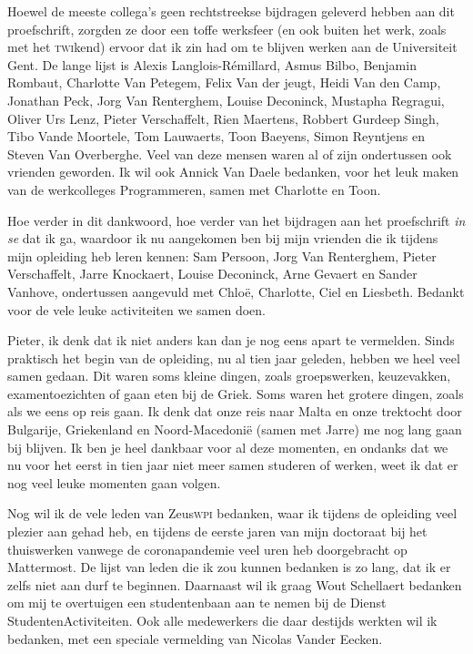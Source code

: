 \documentclass[main]{subfiles}
\begin{document}
Hoewel de meeste collega's geen rechtstreekse bijdragen geleverd hebben aan dit proefschrift, zorgden ze door een toffe werksfeer (en ook buiten het werk, zoals met het \textsc{twi}kend) ervoor dat ik zin had om te blijven werken aan de Universiteit Gent.
De lange lijst is Alexis Langlois-Rémillard, Asmus Bilbo, Benjamin Rombaut, Charlotte Van Petegem, Felix Van der jeugt, Heidi Van den Camp, Jonathan Peck, Jorg Van Renterghem, Louise Deconinck, Mustapha Regragui, Oliver Urs Lenz, Pieter Verschaffelt, Rien Maertens, Robbert Gurdeep Singh, Tibo Vande Moortele, Tom Lauwaerts, Toon Baeyens, Simon Reyntjens en Steven Van Overberghe.
Veel van deze mensen waren al of zijn ondertussen ook vrienden geworden.
Ik wil ook Annick Van Daele bedanken, voor het leuk maken van de werkcolleges Programmeren, samen met Charlotte en Toon.

Hoe verder in dit dankwoord, hoe verder van het bijdragen aan het proefschrift \textit{in se} dat ik ga, waardoor ik nu aangekomen ben bij mijn vrienden die ik tijdens mijn opleiding heb leren kennen: Sam Persoon, Jorg Van Renterghem, Pieter Verschaffelt, Jarre Knockaert, Louise Deconinck, Arne Gevaert en Sander Vanhove, ondertussen aangevuld met Chloë, Charlotte, Ciel en Liesbeth.
Bedankt voor de vele leuke activiteiten we samen doen.

Pieter, ik denk dat ik niet anders kan dan je nog eens apart te vermelden.
Sinds praktisch het begin van de opleiding, nu al tien jaar geleden, hebben we heel veel samen gedaan.
Dit waren soms kleine dingen, zoals groepswerken, keuzevakken, examentoezichten of gaan eten bij de Griek.
Soms waren het grotere dingen, zoals als we eens op reis gaan.
Ik denk dat onze reis naar Malta en onze trektocht door Bulgarije, Griekenland en Noord-Macedonië (samen met Jarre) me nog lang gaan bij blijven.
Ik ben je heel dankbaar voor al deze momenten, en ondanks dat we nu voor het eerst in tien jaar niet meer samen studeren of werken, weet ik dat er nog veel leuke momenten gaan volgen.

Nog wil ik de vele leden van Zeus\textsc{wpi} bedanken, waar ik tijdens de opleiding veel plezier aan gehad heb, en tijdens de eerste jaren van mijn doctoraat bij het thuiswerken vanwege de coronapandemie veel uren heb doorgebracht op Mattermost.
De lijst van leden die ik zou kunnen bedanken is zo lang, dat ik er zelfs niet aan durf te beginnen.
Daarnaast wil ik graag Wout Schellaert bedanken om mij te overtuigen een studentenbaan aan te nemen bij de Dienst StudentenActiviteiten.
Ook alle medewerkers die daar destijds werkten wil ik bedanken, met een speciale vermelding van Nicolas Vander Eecken.
\end{document}
